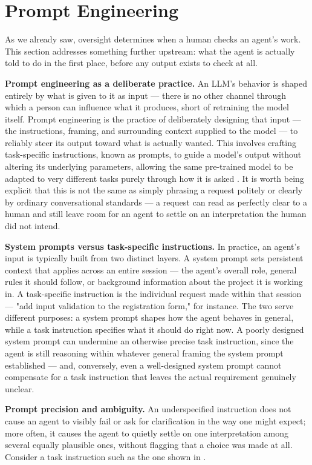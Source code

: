 \section{Prompt Engineering}

As we already saw, oversight determines when a human checks an agent's work. This section addresses something further upstream: what the agent is actually told to do in the first place, before any output exists to check at all.

\textbf{Prompt engineering as a deliberate practice.} An LLM's behavior is shaped entirely by what is given to it as input --- there is no other channel through which a person can influence what it produces, short of retraining the model itself. Prompt engineering is the practice of deliberately designing that input --- the instructions, framing, and surrounding context supplied to the model --- to reliably steer its output toward what is actually wanted. This involves crafting task-specific instructions, known as prompts, to guide a model's output without altering its underlying parameters, allowing the same pre-trained model to be adapted to very different tasks purely through how it is asked \cite{sahoo2024systematic}. It is worth being explicit that this is not the same as simply phrasing a request politely or clearly by ordinary conversational standards --- a request can read as perfectly clear to a human and still leave room for an agent to settle on an interpretation the human did not intend.

\textbf{System prompts versus task-specific instructions.} In practice, an agent's input is typically built from two distinct layers. A system prompt sets persistent context that applies across an entire session --- the agent's overall role, general rules it should follow, or background information about the project it is working in. A task-specific instruction is the individual request made within that session --- "add input validation to the registration form," for instance. The two serve different purposes: a system prompt shapes how the agent behaves in general, while a task instruction specifies what it should do right now. A poorly designed system prompt can undermine an otherwise precise task instruction, since the agent is still reasoning within whatever general framing the system prompt established --- and, conversely, even a well-designed system prompt cannot compensate for a task instruction that leaves the actual requirement genuinely unclear.

\textbf{Prompt precision and ambiguity.} An underspecified instruction does not cause an agent to visibly fail or ask for clarification in the way one might expect; more often, it causes the agent to quietly settle on one interpretation among several equally plausible ones, without flagging that a choice was made at all. Consider a task instruction such as the one shown in .

